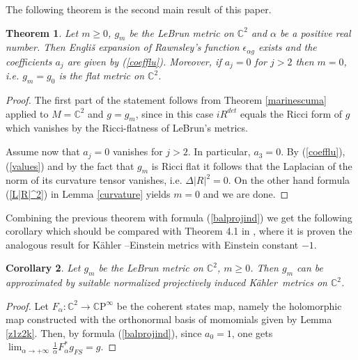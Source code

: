 \documentclass[11pt, reqno]{amsart}
\newtheorem{theor}{Theorem}
\newtheorem{cor}[theor]{Corollary}
\begin{document}
The following theorem is the second main result  of this paper.

\begin{theor}\label{expansion}
Let $m\geq 0$,   $g_m$ be the  LeBrun metric on ${\mathbb{C}}^2$ and $\alpha$ be a positive real number.
Then Engli\v{s} expansion of   Rawnsley's function $\epsilon_{\alpha g}$ exists and the coefficients $a_j$ are given by  (\ref{coefflu}).
Moreover,  if $a_j = 0$ for $j > 2$  then $m=0$, i.e. $g_m=g_0$ is the flat metric on ${\mathbb{C}}^2$.
\end{theor}
\begin{proof}
The first part of the statement follows from Theorem \ref{marinescuma} applied to $M = {\mathbb{C}}^2$ and $g = g_m$, since in this case  $i R^{det}$ equals the Ricci form of $g$ which vanishes by the Ricci-flatness of LeBrun's metrics.

Assume now that $a_j = 0$ vanishes for $j > 2$. In particular, $a_3 = 0$.
By (\ref{coefflu}),  (\ref{values}) and  by the fact that $g_m$  is Ricci flat it follows that   the Laplacian of the norm of its curvature tensor vanishes, i.e.  $\Delta |R|^2 =0$. On the other hand   formula (\ref{L|R|^2}) in Lemma \ref{curvature} yields $m=0$ and we are done.
\end{proof}
Combining the previous theorem with formula  (\ref{balprojind})  we get the following corollary which  should  be compared with
Theorem 4.1 in  \cite{tian}, where it is proven  the analogous result for {K\"{a}hler} --Einstein metrics with Einstein constant
$-1$.

\begin{cor}
Let $g_m$ be the  LeBrun metric on ${\mathbb{C}}^2$, $m\geq 0$.
Then $g_m$ can be approximated by  suitable normalized  projectively induced {K\"{a}hler}\ metrics on ${\mathbb{C}}^2$.
\end{cor}
\begin{proof}
Let  $F_{\alpha}:{\mathbb{C}}^2\rightarrow{\mathbb{C}\mathrm{P}}^{\infty}$ be the coherent states map, namely the holomorphic map
constructed with the orthonormal basis of momomials given by  Lemma \ref{z1z2k}.  Then, by formula
(\ref{balprojind}), since $a_0=1$, one gets
 $\lim_{\alpha\rightarrow +\infty}\frac{1}{\alpha}F_{\alpha}^*g_{FS}=g$.
\end{proof}

\appendix
\end{document}
